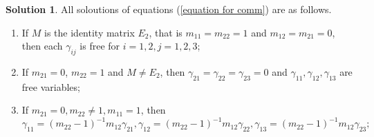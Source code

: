 \documentclass[a4paper,10pt]{amsart}
\theoremstyle{definition}
\newtheorem{solution}[theorem]{Solution}
\numberwithin{equation}{section}
\begin{document}
\begin{solution}\label{solution: commutative}
All soloutions of  equations (\ref{equation for comm}) are as follows.
\begin{enumerate}
\item If $M$ is the identity matrix $E_2$, that is $m_{11}=m_{22}=1$ and $m_{12}=m_{21}=0$, then each $\gamma_{ij}$ is free for $i=1,2,j=1,2,3$;%
\item If $m_{21}=0$, $m_{22}=1$ and $M\neq E_2$, then  $
    \gamma_{21}=\gamma_{22}=\gamma_{23}=0$ and $ \gamma_{11},\gamma_{12},\gamma_{13}$  are free variables; %

\item If $m_{21}=0,m_{22}\neq 1,m_{11}=1$, then
 $\gamma_{11}=(m_{22}-1)^{-1}m_{12}\gamma_{21},
    \gamma_{12}=(m_{22}-1)^{-1}m_{12}\gamma_{22},
    \gamma_{13}=(m_{22}-1)^{-1}m_{12}\gamma_{23};$


\end{enumerate}
\end{solution}
\end{document}
